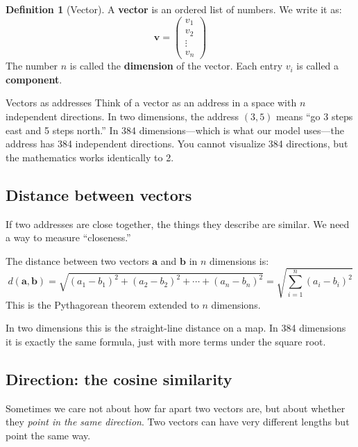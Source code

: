 \documentclass[11pt,a4paper]{article}
\theoremstyle{definition}
\newtheorem{definition}{Definition}[section]
\begin{document}
\begin{definition}[Vector]
A \textbf{vector} is an ordered list of numbers. We write it as:
\[
\mathbf{v} = \begin{pmatrix} v_1 \\ v_2 \\ \vdots \\ v_n \end{pmatrix}
\]
The number $n$ is called the \textbf{dimension} of the vector. Each
entry $v_i$ is called a \textbf{component}.
\end{definition}

\begin{intuition}{Vectors as addresses}
Think of a vector as an address in a space with $n$ independent
directions. In two dimensions, the address $(3, 5)$ means ``go 3
steps east and 5 steps north.'' In 384 dimensions---which is what our
model uses---the address has 384 independent directions. You cannot
visualize 384 directions, but the mathematics works identically to 2.
\end{intuition}

\subsection{Distance between vectors}

If two addresses are close together, the things they describe are
similar. We need a way to measure ``closeness.''

\begin{mathbox}
The distance between two vectors $\mathbf{a}$ and $\mathbf{b}$ in
$n$ dimensions is:
\[
d(\mathbf{a}, \mathbf{b})
= \sqrt{(a_1 - b_1)^2 + (a_2 - b_2)^2 + \cdots + (a_n - b_n)^2}
= \sqrt{\sum_{i=1}^{n} (a_i - b_i)^2}
\]
This is the Pythagorean theorem extended to $n$ dimensions.
\end{mathbox}

In two dimensions this is the straight-line distance on a map. In 384
dimensions it is exactly the same formula, just with more terms under
the square root.

\subsection{Direction: the cosine similarity}

Sometimes we care not about how far apart two vectors are, but about
whether they \emph{point in the same direction}. Two vectors can have
very different lengths but point the same way.
\end{document}

